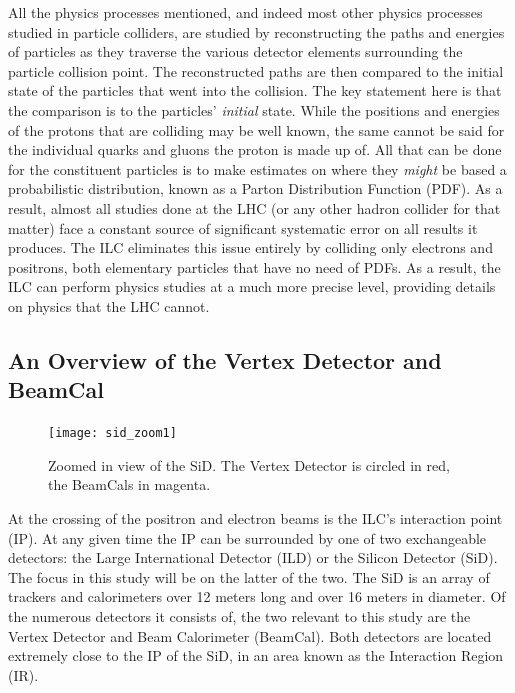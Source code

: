 \documentclass{report}
\begin{document}
                All the physics processes mentioned, and indeed most other physics processes studied in particle colliders, are studied by reconstructing the paths and energies of particles as they traverse the various detector elements surrounding the particle collision point. The reconstructed paths are then compared to the initial state of the particles that went into the collision. The key statement here is that the comparison is to the particles' \textit{initial} state. While the positions and energies of the protons that are colliding may be well known, the same cannot be said for the individual quarks and gluons the proton is made up of. All that can be done for the constituent particles is to make estimates on where they \textit{might} be based a probabilistic distribution, known as a Parton Distribution Function (PDF). As a result, almost all studies done at the LHC (or any other hadron collider for that matter) face a constant source of significant systematic error on all results it produces. The ILC eliminates this issue entirely by colliding only electrons and positrons, both elementary particles that have no need of PDFs. As a result, the ILC can perform physics studies at a much more precise level, providing details on physics that the LHC cannot.

            \subsection{An Overview of the Vertex Detector and BeamCal}
                \begin{figure}[h] 
                    \texttt{[image: sid\_zoom1]}
                    \centering
                    \caption{Zoomed in view of the SiD.
                        The Vertex Detector is circled in red,
                        the BeamCals in magenta.}
                    \label{sid_zoom1}
                \end{figure}

                At the crossing of the positron and electron beams is the ILC's interaction point (IP). At any given time the IP can be surrounded by one of two exchangeable detectors: the Large International Detector (ILD) or the Silicon Detector (SiD). The focus in this study will be on the latter of the two. The SiD is an array of trackers and calorimeters over 12 meters long and over 16 meters in diameter. Of the numerous detectors it consists of, the two relevant to this study are the Vertex Detector and Beam Calorimeter (BeamCal). Both detectors are located extremely close to the IP of the SiD, in an area known as the Interaction Region (IR). 
                
\end{document}
